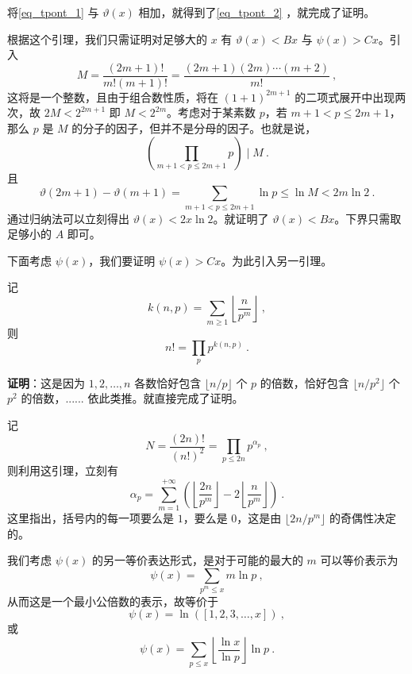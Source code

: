 将\autoref{eq_tpont_1} 与 $\vartheta(x)$ 相加，就得到了\autoref{eq_tpont_2} ，就完成了证明。


根据这个引理，我们只需证明对足够大的 $x$ 有 $\vartheta(x) < Bx$ 与 $\psi(x) > Cx$。引入
\begin{equation}
M = \frac{(2m+1)!}{m! (m+1)!} = \frac{(2m+1)(2m)\cdots(m+2)}{m!} ~,
\end{equation}
这将是一个整数，且由于组合数性质，将在 $(1+1)^{2m+1}$ 的二项式展开中出现两次，故 $2M < 2^{2m+1}$ 即 $M < 2^{2m}$。考虑对于某素数 $p$，若 $m+1 < p \le 2m+1$，那么 $p$ 是 $M$ 的分子的因子，但并不是分母的因子。也就是说，
\begin{equation}
\left( \prod_{m+1 < p \le 2m+1} p \right) \mid M ~.
\end{equation}
且
\begin{equation}
\vartheta(2m+1) - \vartheta(m+1) = \sum_{m+1 < p \le 2m+1} \ln p \le \ln M < 2 m \ln 2 ~.
\end{equation}
通过归纳法可以立刻得出 $\vartheta(x) < 2x \ln 2$。就证明了 $\vartheta(x) < Bx$。下界只需取足够小的 $A$ 即可。

下面考虑 $\psi(x)$，我们要证明 $\psi(x) > Cx$。为此引入另一引理。
\begin{lemma}{}
记 
\begin{equation}
k(n, p) = \sum_{m\ge 1} \left\lfloor  \frac{n}{p^m} \right\rfloor ~,
\end{equation}
则
\begin{equation}
n! = \prod_p p^{k(n, p)} ~.
\end{equation}

\end{lemma}
\textbf{证明}：这是因为 $1, 2, \dots, n$ 各数恰好包含 $\lfloor n/p \rfloor$ 个 $p$ 的倍数，恰好包含 $ \lfloor n/p^2 \rfloor$ 个 $p^2$ 的倍数，...... 依此类推。就直接完成了证明。 

记 
\begin{equation}
N = \frac{(2n)!}{(n!)^2} = \prod_{p \le 2n} p^{\alpha_p} ~,
\end{equation}
则利用这引理，立刻有
\begin{equation}\label{eq_tpont_4}
\alpha_p = \sum_{m=1}^{+\infty} \left( \left\lfloor \frac{2n}{p^m} \right\rfloor - 2  \left\lfloor \frac{n}{p^m} \right\rfloor\right) ~.
\end{equation}
这里指出，括号内的每一项要么是 $1$，要么是 $0$，这是由 $\lfloor 2n/p^m \rfloor$ 的奇偶性决定的。

我们考虑 $\psi(x)$ 的另一等价表达形式，是对于可能的最大的 $m$ 可以等价表示为
\begin{equation}
\psi(x) = \sum_{p^m \le x} m \ln p ~,
\end{equation}
从而这是一个最小公倍数的表示，故等价于
\begin{equation}
\psi(x) = \ln\left( [1, 2, 3, \dots, x] \right)~,
\end{equation}
或
\begin{equation}
\psi(x) = \sum_{p \le x} \left\lfloor \frac{\ln x}{\ln p} \right\rfloor \ln p ~.
\end{equation}

